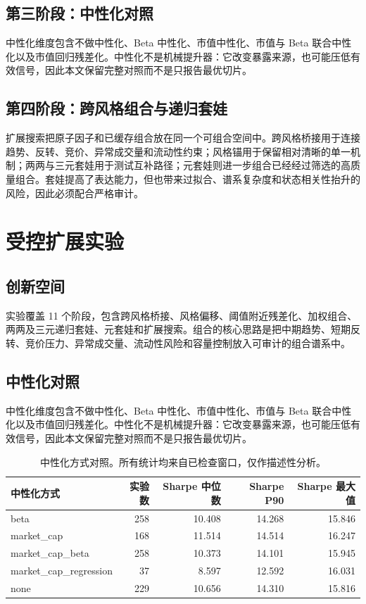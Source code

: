 \documentclass[10pt,a4paper]{article}
\begin{document}
\subsection{第三阶段：中性化对照}
中性化维度包含不做中性化、Beta 中性化、市值中性化、市值与 Beta 联合中性化以及市值回归残差化。中性化不是机械提升器：它改变暴露来源，也可能压低有效信号，因此本文保留完整对照而不是只报告最优切片。

\subsection{第四阶段：跨风格组合与递归套娃}
扩展搜索把原子因子和已缓存组合放在同一个可组合空间中。跨风格桥接用于连接趋势、反转、竞价、异常成交量和流动性约束；风格锚用于保留相对清晰的单一机制；两两与三元套娃用于测试互补路径；元套娃则进一步组合已经经过筛选的高质量组合。套娃提高了表达能力，但也带来过拟合、谱系复杂度和状态相关性抬升的风险，因此必须配合严格审计。

\section{受控扩展实验}
\subsection{创新空间}
实验覆盖 11 个阶段，包含跨风格桥接、风格偏移、阈值附近残差化、加权组合、两两及三元递归套娃、元套娃和扩展搜索。组合的核心思路是把中期趋势、短期反转、竞价压力、异常成交量、流动性风险和容量控制放入可审计的组合谱系中。

\subsection{中性化对照}
中性化维度包含不做中性化、Beta 中性化、市值中性化、市值与 Beta 联合中性化以及市值回归残差化。中性化不是机械提升器：它改变暴露来源，也可能压低有效信号，因此本文保留完整对照而不是只报告最优切片。

\begin{table}[H]
\centering
\small
\begin{tabular}{lrrrr}
\toprule
中性化方式 & 实验数 & Sharpe 中位数 & Sharpe P90 & Sharpe 最大值 \\
\midrule
beta & 258 & 10.408 & 14.268 & 15.846 \\
market\_cap & 168 & 11.514 & 14.514 & 16.247 \\
market\_cap\_beta & 258 & 10.373 & 14.101 & 15.945 \\
market\_cap\_regression & 37 & 8.597 & 12.592 & 16.031 \\
none & 229 & 10.656 & 14.310 & 15.816 \\
\bottomrule
\end{tabular}
\caption{中性化方式对照。所有统计均来自已检查窗口，仅作描述性分析。}
\end{table}
\end{document}
